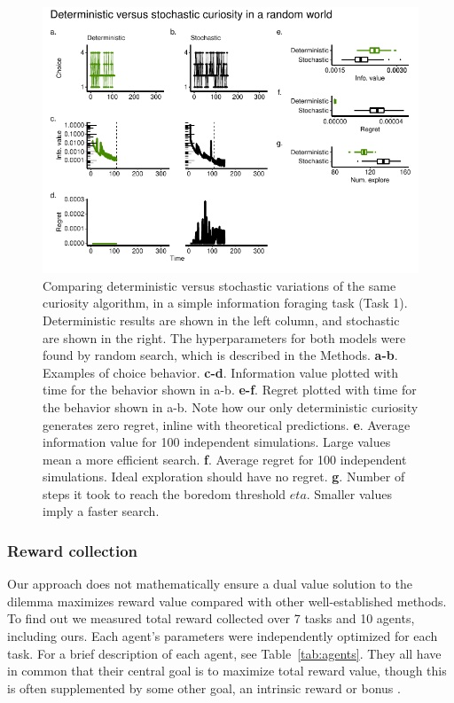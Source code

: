 \begin{figure}
	\includegraphics[width=1.0\linewidth]{img/curiosity1.pdf} 
	\caption{Comparing deterministic versus stochastic variations of the same curiosity algorithm, in a simple information foraging task (Task 1). Deterministic results are shown in the left column, and stochastic are shown in the right. The hyperparameters for both models were found by random search, which is described in the Methods.
	\textbf{a-b}. Examples of choice behavior.
	\textbf{c-d}. Information value plotted with time for the behavior shown in a-b.
	\textbf{e-f}. Regret plotted with time for the behavior shown in a-b. Note how our only deterministic curiosity generates zero regret, inline with theoretical predictions.
	\textbf{e}. Average information value for 100 independent simulations. Large values mean a more efficient search.
	\textbf{f}. Average regret for 100 independent simulations. Ideal exploration should have no regret. 
	\textbf{g}. Number of steps it took to reach the boredom threshold $eta$. Smaller values imply a faster search.
	}
	\label{fig:curiosity1} 
\end{figure}


\subsubsection*{Reward collection} 
Our approach does not mathematically ensure a dual value solution to the dilemma maximizes reward value compared with other well-established methods. To find out we measured total reward collected over 7 tasks and 10 agents, including ours. Each agent's parameters were independently optimized for each task. For a brief description of each agent, see Table~\ref{tab:agents}. They all have in common that their central goal is to maximize total reward value, though this is often supplemented by some other goal, an intrinsic reward or bonus \cite{Ng1999,Sutton1998}. 

